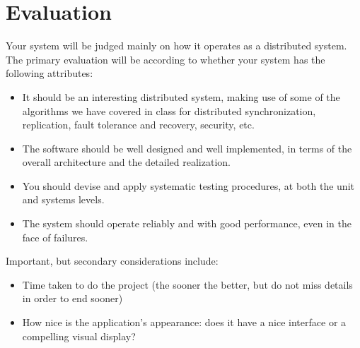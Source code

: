 \documentclass[a4paper, oneside]{memoir}
\begin{document}
\chapter*{Evaluation}
Your system will be judged mainly on how it operates as a distributed system. The primary evaluation will be according to whether your system has the following attributes:
\begin{itemize}
\item  It should be an interesting distributed system, making use of some of the algorithms we have covered in class for distributed synchronization, replication, fault tolerance and recovery, security, etc.
\item The software should be well designed and well implemented, in terms of the overall architecture and the detailed realization.
\item You should devise and apply systematic testing procedures, at both the unit and systems levels.
\item The system should operate reliably and with good performance, even in the face of failures.
\end{itemize}
Important, but secondary considerations include:
\begin{itemize}
\item Time taken to do the project (the sooner the better, but do not miss details in order to end sooner)
\item  How nice is the application's appearance: does it have a nice interface or a compelling visual display?
\end{itemize}
\end{document}
